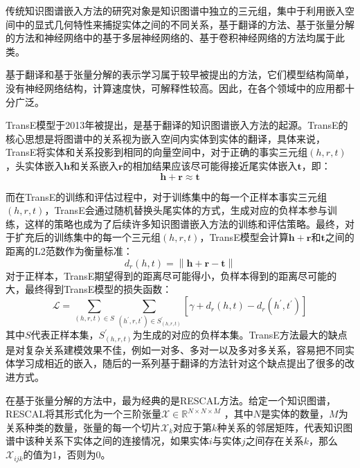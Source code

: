 传统知识图谱嵌入方法的研究对象是知识图谱中独立的三元组，集中于利用嵌入空间中的显式几何特性来捕捉实体之间的不同关系，基于翻译的方法、基于张量分解的方法和神经网络中的基于多层神经网络的、基于卷积神经网络的方法均属于此类。

基于翻译和基于张量分解的表示学习属于较早被提出的方法，它们模型结构简单，没有神经网络结构，计算速度快，可解释性较高。因此，在各个领域中的应用都十分广泛。

TransE模型于2013年被提出，是基于翻译的知识图谱嵌入方法的起源。TransE的核心思想是将图谱中的关系视为嵌入空间内实体到实体的翻译，具体来说，TransE将实体和关系投影到相同的向量空间中，对于正确的事实三元组$(h,r,t)$，头实体嵌入$\boldsymbol{h}$和关系嵌入$\boldsymbol{r}$的相加结果应该尽可能得接近尾实体嵌入$\boldsymbol{t}$，即：
\begin{equation}
  \boldsymbol{h}+\boldsymbol{r}\approx \boldsymbol{t}
\end{equation}

而在TransE的训练和评估过程中，对于训练集中的每一个正样本事实三元组$(h,r,t)$，TransE会通过随机替换头尾实体的方式，生成对应的负样本参与训练，这样的策略也成为了后续许多知识图谱嵌入方法的训练和评估策略。最终，对于扩充后的训练集中的每一个三元组$(h,r,t)$，TransE模型会计算$\boldsymbol{h}+\boldsymbol{r}$和$\boldsymbol{t}$之间的距离的L2范数作为衡量标准：
\begin{equation}
  d_r(h,t)=\left\lVert \boldsymbol{h}+\boldsymbol{r} - \boldsymbol{t}\right\rVert 
\end{equation}
对于正样本，TransE期望得到的距离尽可能得小，负样本得到的距离尽可能的大，最终得到TransE模型的损失函数：
\begin{equation}
  \mathcal{L} =\sum_{(h,r,t)\in S}\sum_{(h^\prime,r,t^\prime)\in S^\prime_{(h,r,t)}}\left[\gamma +d_r(h,t)-d_r(h^\prime,t^\prime)\right] 
\end{equation}
其中$S$代表正样本集，$S^\prime_{(h,r,t)}$为生成的对应的负样本集。TransE方法最大的缺点是对复杂关系建模效果不佳，例如一对多、多对一以及多对多关系，容易把不同实体学习成相近的嵌入，随后的一系列基于翻译的方法针对这个缺点提出了很多的改进方式。

在基于张量分解的方法中，最为经典的是RESCAL方法。给定一个知识图谱，RESCAL将其形式化为一个三阶张量${\mathcal{X} \in \mathbb{R}^{N \times N \times M}}$ ，其中$N$是实体的数量，$M$为关系种类的数量，张量的每一个切片$\mathcal{X}_k$对应于第$k$种关系的邻居矩阵，代表知识图谱中该种关系下实体之间的连接情况，如果实体$i$与实体$j$之间存在关系$k$，那么$\mathcal{X}_{ijk}$的值为1，否则为0。

